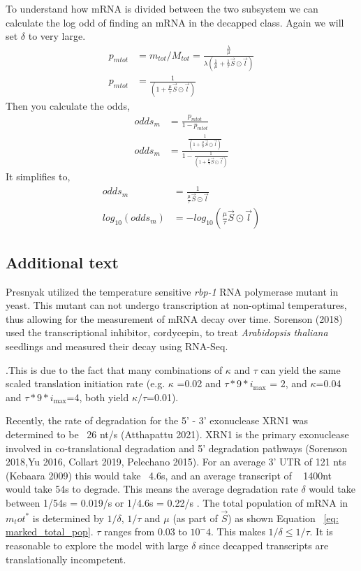 \documentclass[review]{elsarticle}
\newcommand{\imax}{\ensuremath{{i_{\max}}}\xspace}
\begin{document}
To understand how mRNA is divided  between the two subsystem we can calculate the log odd of finding an mRNA in the decapped class. Again we will set $\delta$ to very large.
\begin{align*}
	p_{mtot} &= m_{tot}/M_{tot} = \frac{\frac{\lambda}{\mu}}{\lambda(\frac{1}{\mu} + \frac{1}{\tau}\vec{S} \odot \vec{l})}	\\
	p_{mtot} &= \frac{1}{(1  + \frac{\mu}{\tau}\vec{S} \odot \vec{l})}	
\end{align*}
Then you calculate the odds,
\begin{align}
	odds_{m}& = \frac{p_{mtot}}{1-p_{mtot}}\\
	odds_{m} &= \frac{\frac{1}{(1  + \frac{\mu}{\tau}\vec{S} \odot \vec{l})}}{1-\frac{1}{(1  + \frac{\mu}{\tau}\vec{S} \odot \vec{l})}}
\end{align}
It simplifies to,
\begin{align}
	odds_{m} &= \frac{1}{\frac{\mu}{\tau}\vec{S} \odot \vec{l}} \\
	log_{10}(odds_{m}) &= -log_{10}(\frac{\mu}{\tau}\vec{S} \odot \vec{l}) 
\end{align}


\subsection{Additional text}
 Presnyak utilized the temperature sensitive \textit{rbp-1} RNA polymerase mutant in yeast. This mutant can not undergo transcription at non-optimal temperatures, thus allowing for the measurement of mRNA decay over time. Sorenson (2018) used the transcriptional inhibitor, cordycepin, to treat  \textit{Arabidopsis thaliana} seedlings and measured their decay using RNA-Seq.

.This is due to the fact that many combinations of $\kappa$ and $\tau$ can yield the same scaled translation initiation rate (e.g. $\kappa$ =0.02 and $\tau*9*\imax$ = 2, and $\kappa$=0.04 and $\tau*9*\imax$=4, both yield $\kappa/\tau$=0.01).


	
 Recently, the rate of degradation for the 5' - 3' exonuclease XRN1 was determined to be ~26 nt/s (Atthapattu 2021). XRN1 is the primary exonuclease involved in co-translational degradation and  5' degradation pathways (Sorenson 2018,Yu 2016, Collart 2019, Pelechano 2015). For an average 3' UTR of 121 nts (Kebaara 2009) this would take ~4.6s, and an average transcript of ~ 1400nt would take 54s to degrade.  This means the average degradation rate $\delta$ would take between 1/54s = 0.019/s or 1/4.6s = 0.22/s . The total population of mRNA in $m_tot^*$ is determined by $1/\delta$, $1/\tau$ and $\mu$ (as part of $\vec{S}$) as shown Equation  ~\ref{eq:  marked_total_pop}. $\tau$ ranges from 0.03 to $10^-4$. This makes $1/\delta \leq 1/\tau$. It is reasonable to explore the model with large $\delta$ since decapped transcripts are translationally incompetent. 
\end{document}
